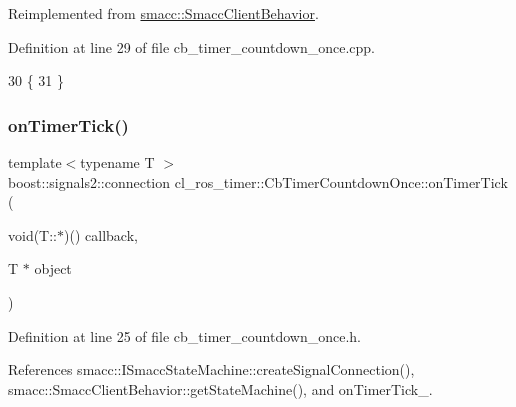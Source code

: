 Reimplemented from \hyperlink{classsmacc_1_1SmaccClientBehavior_ac0cd72d42bd00425362a97c9803ecce5}{smacc\+::\+Smacc\+Client\+Behavior}.



Definition at line 29 of file cb\+\_\+timer\+\_\+countdown\+\_\+once.\+cpp.


\begin{DoxyCode}
30 \{
31 \}
\end{DoxyCode}
\mbox{\label{classcl__ros__timer_1_1CbTimerCountdownOnce_a1e20a8c9a9907db8a1d7dacf8c60ad27}} 
\subsubsection{\texorpdfstring{on\+Timer\+Tick()}{onTimerTick()}}
{\footnotesize\ttfamily template$<$typename T $>$ \\
boost\+::signals2\+::connection cl\+\_\+ros\+\_\+timer\+::\+Cb\+Timer\+Countdown\+Once\+::on\+Timer\+Tick (\begin{DoxyParamCaption}\item[{void(T\+::$\ast$)()}]{callback,  }\item[{T $\ast$}]{object }\end{DoxyParamCaption})\hspace{0.3cm}{\ttfamily [inline]}}



Definition at line 25 of file cb\+\_\+timer\+\_\+countdown\+\_\+once.\+h.



References smacc\+::\+I\+Smacc\+State\+Machine\+::create\+Signal\+Connection(), smacc\+::\+Smacc\+Client\+Behavior\+::get\+State\+Machine(), and on\+Timer\+Tick\+\_\+.


